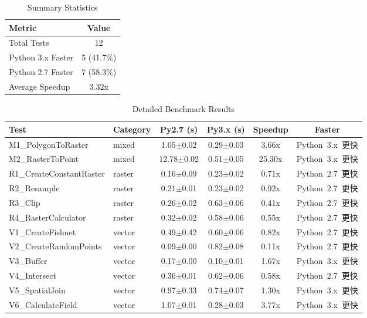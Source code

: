 
\begin{table}[htbp]
\centering
\caption{Summary Statistics}
\begin{tabular}{lc}
\hline
\textbf{Metric} & \textbf{Value} \\
\hline
Total Tests & 12 \\
Python 3.x Faster & 5 (41.7\%) \\
Python 2.7 Faster & 7 (58.3\%) \\
Average Speedup & 3.32x \\
\hline
\end{tabular}
\label{tab:summary_stats}
\end{table}

\begin{table}[htbp]
\centering
\caption{Detailed Benchmark Results}
\begin{tabular}{llcccc}
\hline
\textbf{Test} & \textbf{Category} & \textbf{Py2.7 (s)} & \textbf{Py3.x (s)} & \textbf{Speedup} & \textbf{Faster} \\
\hline
M1\_PolygonToRaster & mixed & 1.05$\pm$0.02 & 0.29$\pm$0.03 & 3.66x & Python\ 3.x\ 更快 \\
M2\_RasterToPoint & mixed & 12.78$\pm$0.02 & 0.51$\pm$0.05 & 25.30x & Python\ 3.x\ 更快 \\
R1\_CreateConstantRaster & raster & 0.16$\pm$0.09 & 0.23$\pm$0.02 & 0.71x & Python\ 2.7\ 更快 \\
R2\_Resample & raster & 0.21$\pm$0.01 & 0.23$\pm$0.02 & 0.92x & Python\ 2.7\ 更快 \\
R3\_Clip & raster & 0.26$\pm$0.02 & 0.63$\pm$0.06 & 0.41x & Python\ 2.7\ 更快 \\
R4\_RasterCalculator & raster & 0.32$\pm$0.02 & 0.58$\pm$0.06 & 0.55x & Python\ 2.7\ 更快 \\
V1\_CreateFishnet & vector & 0.49$\pm$0.42 & 0.60$\pm$0.06 & 0.82x & Python\ 2.7\ 更快 \\
V2\_CreateRandomPoints & vector & 0.09$\pm$0.00 & 0.82$\pm$0.08 & 0.11x & Python\ 2.7\ 更快 \\
V3\_Buffer & vector & 0.17$\pm$0.00 & 0.10$\pm$0.01 & 1.67x & Python\ 3.x\ 更快 \\
V4\_Intersect & vector & 0.36$\pm$0.01 & 0.62$\pm$0.06 & 0.58x & Python\ 2.7\ 更快 \\
V5\_SpatialJoin & vector & 0.97$\pm$0.33 & 0.74$\pm$0.07 & 1.30x & Python\ 3.x\ 更快 \\
V6\_CalculateField & vector & 1.07$\pm$0.01 & 0.28$\pm$0.03 & 3.77x & Python\ 3.x\ 更快 \\
\hline
\end{tabular}
\label{tab:detailed_results}
\end{table}